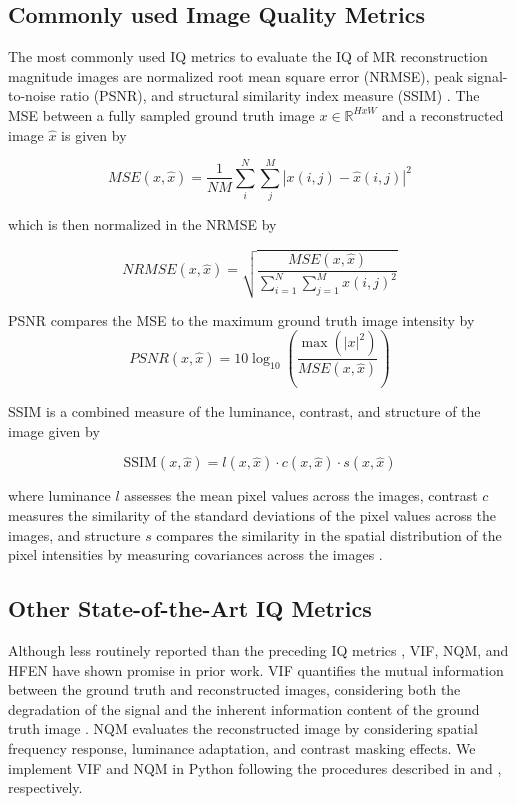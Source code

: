 \documentclass[AMA,STIX2COL,Linenumberson]{MRM}
\begin{document}
\subsection{Commonly used Image Quality Metrics}

The most commonly used IQ metrics to evaluate the IQ of MR reconstruction magnitude images are normalized root mean square error (NRMSE), peak signal-to-noise ratio (PSNR), and structural similarity index measure (SSIM) \cite{chen2022ai}. The MSE between a fully sampled ground truth image $x \in \mathbb{R}^{HxW}$ and a reconstructed image $\hat{x}$ is given by

\begin{equation}
  MSE(x,\hat{x}) = {\frac{1}{NM}\sum_{i}^{N}\sum_{j}^{M}|x(i,j)-\hat{x}(i,j)|^2}
  \label{eq:MSE}
\end{equation}

which is then normalized in the NRMSE by 

\begin{equation}
    NRMSE(x,\hat{x}) = \sqrt{\frac{MSE(x,\hat{x})}{\sum_{i=1}^{N}\sum_{j=1}^{M} x(i,j)^2}}
  \label{eq:NRMSE}
\end{equation}


PSNR compares the MSE to the maximum ground truth image intensity by
\begin{equation}
PSNR(x,\hat{x}) = 10 \log_{10}\left(\frac{\max(|x|^2)}{MSE(x,\hat{x})}\right)
  \label{eq:PSNR}
\end{equation}

SSIM is a combined measure of the luminance, contrast, and structure of the image given by\cite{wang2004image}

\begin{equation}
\text{SSIM}(x, \hat{x}) = l(x, \hat{x})\cdot c(x, \hat{x}) \cdot s(x, \hat{x})
\label{eq:SSIM}
\end{equation}

where luminance $l$ assesses the mean pixel values across the images, contrast $c$ measures the similarity of the standard deviations of the pixel values across the images, and structure $s$ compares the similarity in the spatial distribution of the pixel intensities by measuring covariances across the images \cite{wang2004image}. 

\subsection{Other State-of-the-Art IQ Metrics}

Although less routinely reported than the preceding IQ metrics \cite{chen2022ai}, VIF, NQM, and HFEN have shown promise in prior work. VIF quantifies the mutual information between the ground truth and reconstructed images, considering both the degradation of the signal and the inherent information content of the ground truth image \cite{sheikh2006image}. NQM evaluates the reconstructed image by considering spatial frequency response, luminance adaptation, and contrast masking effects. We implement VIF and NQM in Python following the procedures described in \cite{sheikh2006image} and \cite{damera2000image}, respectively.
\end{document}
